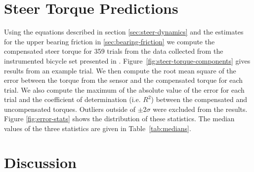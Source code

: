 \documentclass[10pt]{article}
\begin{document}

\section*{Steer Torque Predictions}

Using the equations described in section \ref{sec:steer-dynamics} and the
estimates for the upper bearing friction in \ref{sec:bearing-friction} we
compute the compensated steer torque for 359 trials from the data collected
from the instrumented bicycle set presented in \cite{Moore2012}.
Figure~\ref{fig:steer-torque-components} gives results from an example trial.
We then compute the root mean square of the error between the torque from the
sensor and the compensated torque for each trial. We also compute the maximum
of the absolute value of the error for each trial and the coefficient of
determination (i.e. $R^2$) between the compensated and uncompensated torques.
Outliers outside of $\pm2 \sigma$ were excluded from the results. Figure
\ref{fig:error-stats} shows the distribution of these statistics. The median
values of the three statistics are given in Table~\ref{tab:medians}.

\section*{Discussion}
\end{document}
